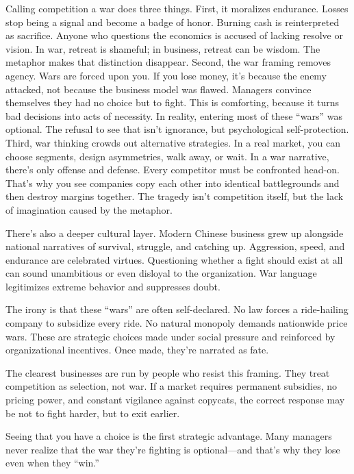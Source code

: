 Calling competition a war does three things. First, it moralizes endurance. Losses stop being a signal and become a badge of honor. Burning cash is reinterpreted as sacrifice. Anyone who questions the economics is accused of lacking resolve or vision. In war, retreat is shameful; in business, retreat can be wisdom. The metaphor makes that distinction disappear.
Second, the war framing removes agency. Wars are forced upon you. If you lose money, it's because the enemy attacked, not because the business model was flawed. Managers convince themselves they had no choice but to fight. This is comforting, because it turns bad decisions into acts of necessity. In reality, entering most of these ``wars'' was optional. The refusal to see that isn't ignorance, but psychological self-protection.
Third, war thinking crowds out alternative strategies. In a real market, you can choose segments, design asymmetries, walk away, or wait. In a war narrative, there's only offense and defense. Every competitor must be confronted head-on. That's why you see companies copy each other into identical battlegrounds and then destroy margins together. The tragedy isn't competition itself, but the lack of imagination caused by the metaphor.

There's also a deeper cultural layer. Modern Chinese business grew up alongside national narratives of survival, struggle, and catching up. Aggression, speed, and endurance are celebrated virtues. Questioning whether a fight should exist at all can sound unambitious or even disloyal to the organization. War language legitimizes extreme behavior and suppresses doubt.

The irony is that these ``wars'' are often self-declared. No law forces a ride-hailing company to subsidize every ride. No natural monopoly demands nationwide price wars. These are strategic choices made under social pressure and reinforced by organizational incentives. Once made, they're narrated as fate.

The clearest businesses are run by people who resist this framing. They treat competition as selection, not war. If a market requires permanent subsidies, no pricing power, and constant vigilance against copycats, the correct response may be not to fight harder, but to exit earlier.

Seeing that you have a choice is the first strategic advantage. Many managers never realize that the war they're fighting is optional—and that's why they lose even when they ``win.''